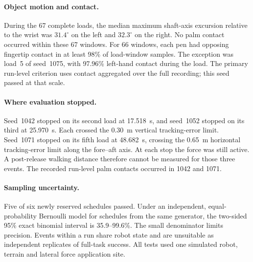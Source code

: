 \paragraph{Object motion and contact.}
During the 67 complete loads, the median maximum shaft-axis excursion relative to the wrist was $31.4^\circ$ on the left and $32.3^\circ$ on the right. No palm contact occurred within these 67 windows. For 66 windows, each pen had opposing fingertip contact in at least 98\% of load-window samples. The exception was load~5 of seed~1075, with 97.96\% left-hand contact during the load. The primary run-level criterion uses contact aggregated over the full recording; this seed passed at that scale.

\paragraph{Where evaluation stopped.}
Seed~1042 stopped on its second load at 17.518~s, and seed~1052 stopped on its third at 25.970~s. Each crossed the 0.30~m vertical tracking-error limit. Seed~1071 stopped on its fifth load at 48.682~s, crossing the 0.65~m horizontal tracking-error limit along the fore--aft axis. At each stop the force was still active. A post-release walking distance therefore cannot be measured for those three events. The recorded run-level palm contacts occurred in 1042 and 1071.

\paragraph{Sampling uncertainty.}
Five of six newly reserved schedules passed. Under an independent, equal-probability Bernoulli model for schedules from the same generator, the two-sided 95\% exact binomial interval is 35.9--99.6\%. The small denominator limits precision. Events within a run share robot state and are unsuitable as independent replicates of full-task success. All tests used one simulated robot, terrain and lateral force application site.
